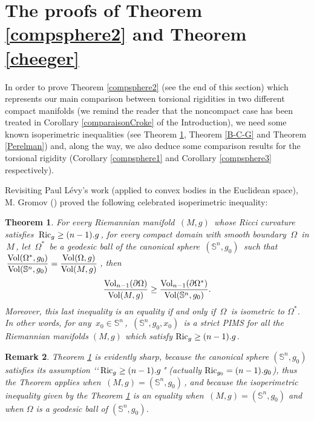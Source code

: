 \documentclass[11pt, reqno]{amsart}
\newtheorem{theoreme}{Theorem}[section]
\newtheorem{remarque}[theoreme]{Remark}
\theoremstyle{plain}
\begin{document}
\section{The proofs of Theorem \ref{compsphere2} and Theorem \ref{cheeger}}
In order to prove Theorem \ref{compsphere2} (see the end of this section)  which represents our main comparison between   torsional rigidities  in two different  compact manifolds (we remind the reader that the noncompact case has been treated in Corollary \ref{comparaisonCroke} of the Introduction), 
we need some known   isoperimetric inequalities (see Theorem \ref{Gromov}, Theorem  \ref{B-C-G} and  Theorem \ref{Perelman}) and, 
along the way, we also deduce some comparison results for the torsional rigidity (Corollary \ref{compsphere1}
and Corollary \ref{compsphere3} respectively).

\vskip 0.3cm

Revisiting Paul L\'{e}vy's work \cite{Le} (applied to convex bodies in the Euclidean space), M. Gromov (\cite{Gr}) 
proved the following celebrated isoperimetric inequality: 
\begin{theoreme}\label{Gromov} For every Riemannian manifold $\,(M,g)\,$ whose Ricci
curvature satisfies $\,{\rm Ric}_g \ge (n-1).g\,$, for every compact domain with smooth boundary 
$\,\Omega \,$ in $\, M \,$, let $\,\Omega^*\,$ be a geodesic ball of  the canonical sphere 
$\, (\mathbb S^n , g_0 )\,$ such that 
$\,\dfrac{{\rm Vol} (\Omega^*, g_0)}{{\rm Vol} (\mathbb S^n , g_0 )} 
= \dfrac{{\rm Vol} (\Omega , g )}{{\rm Vol} (M , g )}\,$, then
$$\dfrac{{\rm Vol}_{n-1}(\partial \Omega)}{{\rm Vol} (M , g )} \ge 
\dfrac{{\rm Vol}_{n-1}(\partial \Omega^*)}{{\rm Vol}  (\mathbb S^n , g_0 )}.$$
Moreover, this last inequality is an equality if and only if $\,\Omega\,$ is isometric to $\Omega^*$.
In other words, for any $\, x_0 \in \mathbb S^n \,$, $ \,(\mathbb S^n , g_0 , x_0)\,$ is a strict PIMS   for all the 
Riemannian manifolds $(M,g)$ which satisfy ${\rm Ric}_g \ge (n-1).g$.
\end{theoreme}

\begin{remarque}\rm
Theorem \ref{Gromov} is evidently sharp, because the canonical sphere $(\mathbb S^n , g_0 )$ satisfies its assumption 
\lq \lq $\,{\rm Ric}_g \ge (n-1).g\,$" (actually ${\rm Ric}_{g_0} = (n-1).g_0$), thus the Theorem applies when $\, (M, g) = 
(\mathbb S^n , g_0 )\,$, and because the isoperimetric inequality given by the Theorem
\ref{Gromov} is an equality when $\, (M, g) = (\mathbb S^n , g_0 )$ and when $\Omega$ is a geodesic ball of $(\mathbb S^n , g_0 )$.
\end{remarque}
\end{document}
